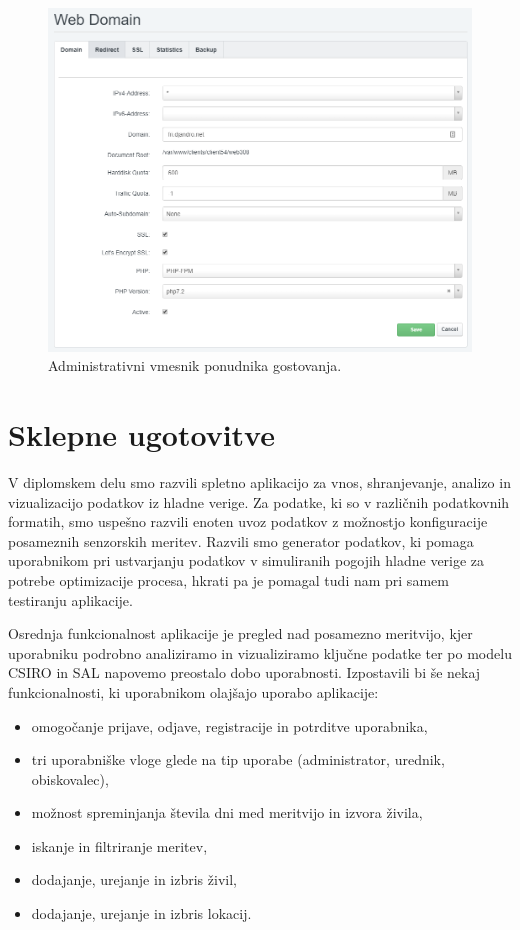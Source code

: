 \documentclass[a4paper, 12pt]{book}
\begin{document}
\begin{figure}[h]
\begin{center}
\includegraphics[width=\textwidth]{slike/admin_vmesnik.png}
\end{center}
\caption{Administrativni vmesnik ponudnika gostovanja.}
\label{ss-admim-gui}
\end{figure}



\chapter{Sklepne ugotovitve}

V diplomskem delu smo razvili spletno aplikacijo za vnos, shranjevanje, analizo in vizualizacijo podatkov iz hladne verige. Za podatke, ki so v različnih podatkovnih formatih, smo uspešno razvili enoten uvoz podatkov z možnostjo konfiguracije posameznih senzorskih meritev. Razvili smo generator podatkov, ki pomaga uporabnikom pri ustvarjanju podatkov v simuliranih pogojih hladne verige za potrebe optimizacije procesa, hkrati pa je pomagal tudi nam pri samem testiranju aplikacije. 

Osrednja funkcionalnost aplikacije je pregled nad posamezno meritvijo, kjer uporabniku podrobno analiziramo in vizualiziramo ključne podatke ter po modelu CSIRO in SAL napovemo preostalo dobo uporabnosti. Izpostavili bi še nekaj funkcionalnosti, ki uporabnikom olajšajo uporabo aplikacije:

\begin{itemize}
	\item omogočanje prijave, odjave, registracije in potrditve uporabnika,
	\item tri uporabniške vloge glede na tip uporabe (administrator, urednik, obiskovalec),
	\item možnost spreminjanja števila dni med meritvijo in izvora živila,
	\item iskanje in filtriranje meritev,
	\item dodajanje, urejanje in izbris živil,
	\item dodajanje, urejanje in izbris lokacij.
\end{itemize}
\end{document}

